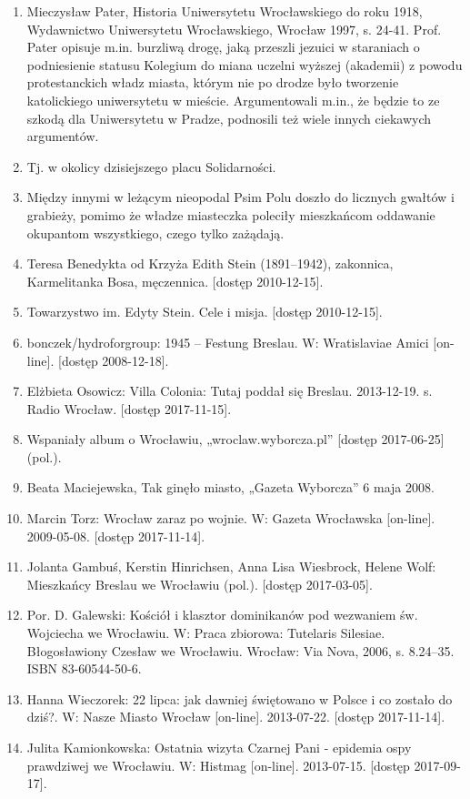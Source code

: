 \documentclass{article}
\begin{document}
\begin{enumerate}
    \item  Mieczysław Pater, Historia Uniwersytetu Wrocławskiego do roku 1918, Wydawnictwo Uniwersytetu Wrocławskiego, Wrocław 1997, s. 24-41. Prof. Pater opisuje m.in. burzliwą drogę, jaką przeszli jezuici w staraniach o podniesienie statusu Kolegium do miana uczelni wyższej (akademii) z powodu protestanckich władz miasta, którym nie po drodze było tworzenie katolickiego uniwersytetu w mieście. Argumentowali m.in., że będzie to ze szkodą dla Uniwersytetu w Pradze, podnosili też wiele innych ciekawych argumentów.
    \item  Tj. w okolicy dzisiejszego placu Solidarności.
    \item  Między innymi w leżącym nieopodal Psim Polu doszło do licznych gwałtów i grabieży, pomimo że władze miasteczka poleciły mieszkańcom oddawanie okupantom wszystkiego, czego tylko zażądają.
    \item Teresa Benedykta od Krzyża Edith Stein (1891–1942), zakonnica, Karmelitanka Bosa, męczennica. [dostęp 2010-12-15].
    \item  Towarzystwo im. Edyty Stein. Cele i misja. [dostęp 2010-12-15].
    \item bonczek/hydroforgroup: 1945 – Festung Breslau. W: Wratislaviae Amici [on-line]. [dostęp 2008-12-18].
    \item  Elżbieta Osowicz: Villa Colonia: Tutaj poddał się Breslau. 2013-12-19. s. Radio Wrocław. [dostęp 2017-11-15].
    \item  Wspaniały album o Wrocławiu, „wroclaw.wyborcza.pl” [dostęp 2017-06-25] (pol.).
    \item  Beata Maciejewska, Tak ginęło miasto, „Gazeta Wyborcza” 6 maja 2008.
    \item  Marcin Torz: Wrocław zaraz po wojnie. W: Gazeta Wrocławska [on-line]. 2009-05-08. [dostęp 2017-11-14].
    \item  Jolanta Gambuś, Kerstin Hinrichsen, Anna Lisa Wiesbrock, Helene Wolf: Mieszkańcy Breslau we Wrocławiu (pol.). [dostęp 2017-03-05].
    \item  Por. D. Galewski: Kościół i klasztor dominikanów pod wezwaniem św. Wojciecha we Wrocławiu. W: Praca zbiorowa: Tutelaris Silesiae. Błogosławiony Czesław we Wrocławiu. Wrocław: Via Nova, 2006, s. 8.24–35. ISBN 83-60544-50-6.
    \item  Hanna Wieczorek: 22 lipca: jak dawniej świętowano w Polsce i co zostało do dziś?. W: Nasze Miasto Wrocław [on-line]. 2013-07-22. [dostęp 2017-11-14].
    \item  Julita Kamionkowska: Ostatnia wizyta Czarnej Pani - epidemia ospy prawdziwej we Wrocławiu. W: Histmag [on-line]. 2013-07-15. [dostęp 2017-09-17].

\end{enumerate}
\end{document}
